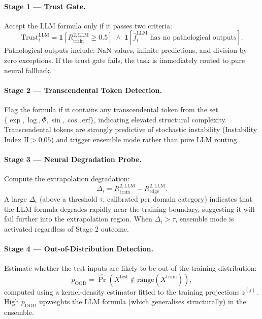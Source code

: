 \documentclass[twoside,11pt]{article}
\newcommand{\II}{\mathrm{II}}
\begin{document}
\paragraph{Stage 1 --- Trust Gate.}
Accept the LLM formula only if it passes two criteria:
\begin{equation}
  \text{Trust}_i^{\mathrm{LLM}} = \mathbf{1}\!\left[{R^{2,\mathrm{LLM}}_{\mathrm{train}}} \ge 0.5\right]
  \;\land\; \mathbf{1}\!\left[\hat{f}^{\mathrm{LLM}}_i \text{ has no pathological outputs}\right].
  \label{eq:trust}
\end{equation}
Pathological outputs include: NaN values, infinite predictions, and division-by-zero
exceptions.  If the trust gate fails, the task is immediately routed to pure neural
fallback.

\paragraph{Stage 2 --- Transcendental Token Detection.}
Flag the formula if it contains any transcendental token from the set
$\{\exp, \log, \Phi, \sin, \cos, \mathrm{erf}\}$, indicating elevated structural
complexity.  Transcendental tokens are strongly predictive of stochastic instability
(Instability Index $\II > 0.05$) and trigger ensemble mode rather than pure LLM
routing.

\paragraph{Stage 3 --- Neural Degradation Probe.}
Compute the extrapolation degradation:
\begin{equation}
  \Delta_i = {R^{2,\mathrm{LLM}}_{\mathrm{train}}} - {R^{2,\mathrm{LLM}}_{\mathrm{edge}}}.
  \label{eq:degradation}
\end{equation}
A large $\Delta_i$ (above a threshold $\tau$, calibrated per domain category)
indicates that the LLM formula degrades rapidly near the training boundary,
suggesting it will fail further into the extrapolation region.  When $\Delta_i > \tau$,
ensemble mode is activated regardless of Stage 2 outcome.

\paragraph{Stage 4 --- Out-of-Distribution Detection.}
Estimate whether the test inputs are likely to be out of the training distribution:
\begin{equation}
  p_{\mathrm{OOD}} = \hat{\Pr}\!\left(X^{\mathrm{test}} \notin \mathrm{range}(X^{\mathrm{train}})\right),
  \label{eq:ood}
\end{equation}
computed using a kernel-density estimator fitted to the training projections $z^{(j)}$.
High $p_{\mathrm{OOD}}$ upweights the LLM formula (which generalises structurally) in
the ensemble.
\end{document}
